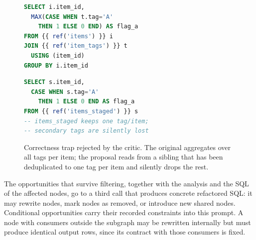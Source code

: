 \begin{figure}[!htbp]
\begin{minipage}[t]{0.48\linewidth}
\begin{lstlisting}[language=SQL]
SELECT i.item_id,
  MAX(CASE WHEN t.tag='A'
    THEN 1 ELSE 0 END) AS flag_a
FROM {{ ref('items') }} i
JOIN {{ ref('item_tags') }} t
  USING (item_id)
GROUP BY i.item_id
\end{lstlisting}
\end{minipage}
\hfill
\begin{minipage}[t]{0.48\linewidth}
\begin{lstlisting}[language=SQL]
SELECT s.item_id,
  CASE WHEN s.tag='A'
    THEN 1 ELSE 0 END AS flag_a
FROM {{ ref('items_staged') }} s
-- items_staged keeps one tag/item;
-- secondary tags are silently lost
\end{lstlisting}
\end{minipage}
\inv
\caption{Correctness trap rejected by the critic. The original aggregates over all tags per item; the proposal reads from a sibling that has been deduplicated to one tag per item and silently drops the rest.}
\label{dag:fig:critic-catch}
\inv
\end{figure}

The opportunities that survive filtering, together with the analysis and the SQL of the affected nodes, go to a third call that produces concrete refactored SQL: it may rewrite nodes, mark nodes as removed, or introduce new shared nodes. Conditional opportunities carry their recorded constraints into this prompt. A node with consumers outside the subgraph may be rewritten internally but must produce identical output rows, since its contract with those consumers is fixed.


